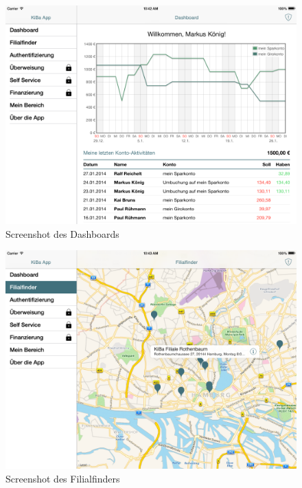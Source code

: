 \vspace{-24pt}
\begin{figure}[h!]
	\centering
  	\includegraphics[height=0.25\textheight]{Pictures/Dashboard}
	\vspace{-12pt}	
	\caption{Screenshot des Dashboards}
	\label{fig1}
\end{figure}
\vspace{-12pt}
\begin{figure}[h!]
	\centering
	\includegraphics[height=0.25\textheight]{Pictures/filialfinder}
	\vspace{-12pt}	
	\caption{Screenshot des Filialfinders}
	\label{fig2}
\end{figure}
